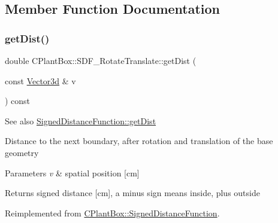 \subsection{Member Function Documentation}
\mbox{\label{classCPlantBox_1_1SDF__RotateTranslate_aa28e32386597198bb1d74361b284c1f5}} 
\subsubsection{\texorpdfstring{get\+Dist()}{getDist()}}
{\footnotesize\ttfamily double C\+Plant\+Box\+::\+S\+D\+F\+\_\+\+Rotate\+Translate\+::get\+Dist (\begin{DoxyParamCaption}\item[{const \hyperlink{classCPlantBox_1_1Vector3d}{Vector3d} \&}]{v }\end{DoxyParamCaption}) const\hspace{0.3cm}{\ttfamily [virtual]}}

\begin{DoxySeeAlso}{See also}
\hyperlink{classCPlantBox_1_1SignedDistanceFunction_a8e58237574af3673906bba84d5d14ee8}{Signed\+Distance\+Function\+::get\+Dist}
\end{DoxySeeAlso}
Distance to the next boundary, after rotation and translation of the base geometry


\begin{DoxyParams}{Parameters}
{\em v} & spatial position \mbox{[}cm\mbox{]} \\
\hline
\end{DoxyParams}
\begin{DoxyReturn}{Returns}
signed distance \mbox{[}cm\mbox{]}, a minus sign means inside, plus outside 
\end{DoxyReturn}


Reimplemented from \hyperlink{classCPlantBox_1_1SignedDistanceFunction_a8e58237574af3673906bba84d5d14ee8}{C\+Plant\+Box\+::\+Signed\+Distance\+Function}.

\mbox{\label{classCPlantBox_1_1SDF__RotateTranslate_aff09310a5f6e7fb009c442b786bcd45c}} 
